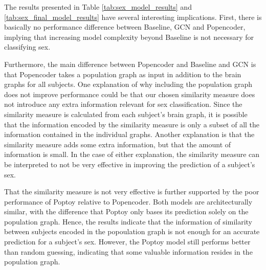 The results presented in Table \ref{tab:sex_model_results} and \ref{tab:sex_final_model_results} have several interesting implications. First, there is basically no performance difference between Baseline, GCN and Popencoder, implying that increasing model complexity beyond Baseline is not necessary for classifying sex. 

Furthermore, the main difference between Popencoder and Baseline and GCN is that Popencoder takes a population graph as input in addition to the brain graphs for all subjects. One explanation of why including the population graph does not improve performance could be that our chosen similarity measure does not introduce any extra information relevant for sex classification. Since the similarity measure is calculated from each subject's brain graph, it is possible that the information encoded by the similarity measure is only a subset of all the information contained in the individual graphs. Another explanation is that the similarity measure adds some extra information, but that the amount of information is small. In the case of either explanation, the similarity measure can be interpreted to not be very effective in improving the prediction of a subject's sex. 

That the similarity measure is not very effective is further supported by the poor performance of Poptoy relative to Popencoder. Both models are architecturally similar, with the difference that Poptoy only bases its prediction solely on the population graph. Hence, the results indicate that the information of similarity between subjects encoded in the popoulation graph is not enough for an accurate prediction for a subject's sex. However, the Poptoy model still performs better than random guessing, indicating that some valuable information resides in the population graph. 



